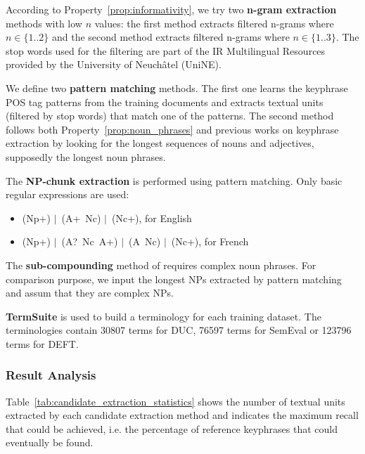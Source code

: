       According to Property~\ref{prop:informativity}, we try two \textbf{n-gram
      extraction} methods with low $n$ values: the first method extracts
      filtered n-grams where $n \in \{1..2\}$ and the second method extracts
      filtered n-grams where $n \in \{1..3\}$. The stop words used for the
      filtering are part of the IR Multilingual Resources provided by the
      University of Neuchâtel (UniNE).

      We define two \textbf{pattern matching} methods. The first one learns the
      keyphrase POS tag patterns from the training documents and extracts
      textual units (filtered by stop words) that match one of the patterns. The
      second method follows both Property~\ref{prop:noun_phrases} and previous
      works on keyphrase extraction by looking for the longest sequences of
      nouns and adjectives, supposedly the longest noun phrases.

      The \textbf{NP-chunk extraction} is performed using pattern matching. Only
      basic regular expressions are used:
      \begin{itemize}
        \item{(Np+) $|$~(A+~Nc) $|$~(Nc+), for English}
        \item{(Np+) $|$~(A?~Nc~A+) $|$~(A~Nc) $|$~(Nc+),
              for French}
      \end{itemize}

      The \textbf{sub-compounding} method of
       requires complex noun phrases. For
      comparison purpose, we input the longest NPs extracted by pattern
      matching and assum that they are complex NPs.

      \textbf{TermSuite} is used to build a terminology for each training
      dataset. The terminologies contain 30807 terms for DUC, 76597 terms for
      SemEval or 123796 terms for DEFT.

    \subsubsection{Result Analysis}
    \label{subsubsec:candidate_extraction_result_analysis}
      Table~\ref{tab:candidate_extraction_statistics} shows the number of
      textual units extracted by each candidate extraction method and indicates
      the maximum recall that could be achieved, i.e. the percentage of
      reference keyphrases that could eventually be found.

